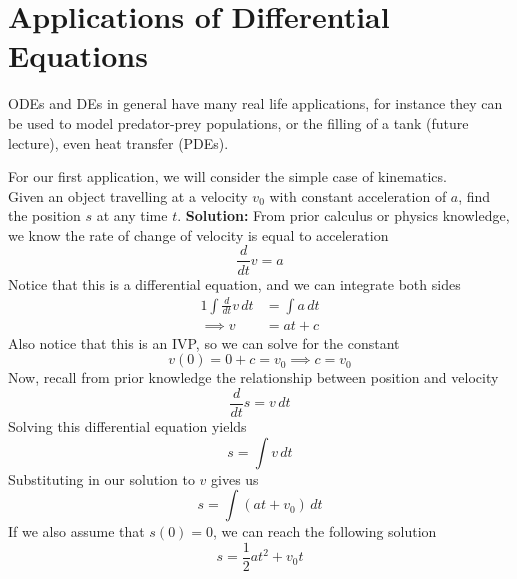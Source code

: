\documentclass[diffeq.tex]{subfiles}
\begin{document}
    \section{Applications of Differential Equations}
    ODEs and DEs in general have many real life applications, for instance they can be used to model predator-prey populations, or the filling of a tank (future lecture), even heat transfer (PDEs).
    \begin{example}[Kinematics]
        For our first application, we will consider the simple case of kinematics.\\
        Given an object travelling at a velocity $v_{0}$ with constant acceleration of $a$, find the position $s$ at any time $t$.
        \textbf{Solution:}
        From prior calculus or physics knowledge, we know the rate of change of velocity is equal to acceleration
        \begin{equation}
            \frac{d}{dt}v = a
        \end{equation}
        Notice that this is a differential equation, and we can integrate both sides
        \begin{alignat}{1}
            \int \frac{d}{dt}v\,dt &= \int a\,dt\\
            \implies v &= at + c
        \end{alignat}
        Also notice that this is an IVP, so we can solve for the constant
        \begin{equation}
            v(0) = 0 + c = v_{0} \implies c = v_{0}
        \end{equation}
        Now, recall from prior knowledge the relationship between position and velocity
        \begin{equation}
            \frac{d}{dt}s = v\,dt
        \end{equation}
        Solving this differential equation yields
        \begin{equation}
            s = \int v\,dt
        \end{equation}
        Substituting in our solution to $v$ gives us
        \begin{equation}
            s = \int(at + v_{0})\,dt
        \end{equation}
        If we also assume that $s(0) = 0$, we can reach the following solution
        \begin{equation}
            s = \frac{1}{2}at^{2} + v_{0}t
        \end{equation}
    \end{example}
\end{document}
